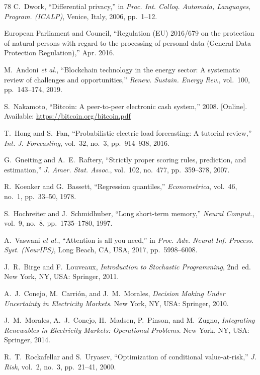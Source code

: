 \documentclass[journal]{IEEEtran}
\begin{document}
\begin{thebibliography}{78}
 C.~Dwork, ``Differential privacy,'' in \textit{Proc. Int. Colloq. Automata, Languages, Program. (ICALP)}, Venice, Italy, 2006, pp.~1--12.

 European Parliament and Council, ``Regulation (EU) 2016/679 on the protection of natural persons with regard to the processing of personal data (General Data Protection Regulation),'' Apr. 2016.

 M.~Andoni \textit{et al.}, ``Blockchain technology in the energy sector: A systematic review of challenges and opportunities,'' \textit{Renew. Sustain. Energy Rev.}, vol.~100, pp.~143--174, 2019.

 S.~Nakamoto, ``Bitcoin: A peer-to-peer electronic cash system,'' 2008. [Online]. Available: \url{https://bitcoin.org/bitcoin.pdf}

 T.~Hong and S.~Fan, ``Probabilistic electric load forecasting: A tutorial review,'' \textit{Int. J. Forecasting}, vol.~32, no.~3, pp.~914--938, 2016.

 G.~Gneiting and A.~E.~Raftery, ``Strictly proper scoring rules, prediction, and estimation,'' \textit{J. Amer. Stat. Assoc.}, vol.~102, no.~477, pp.~359--378, 2007.

 R.~Koenker and G.~Bassett, ``Regression quantiles,'' \textit{Econometrica}, vol.~46, no.~1, pp.~33--50, 1978.

 S.~Hochreiter and J.~Schmidhuber, ``Long short-term memory,'' \textit{Neural Comput.}, vol.~9, no.~8, pp.~1735--1780, 1997.

 A.~Vaswani \textit{et al.}, ``Attention is all you need,'' in \textit{Proc. Adv. Neural Inf. Process. Syst. (NeurIPS)}, Long Beach, CA, USA, 2017, pp.~5998--6008.

 J.~R.~Birge and F.~Louveaux, \textit{Introduction to Stochastic Programming}, 2nd~ed. New York, NY, USA: Springer, 2011.

 A.~J.~Conejo, M.~Carri\'{o}n, and J.~M.~Morales, \textit{Decision Making Under Uncertainty in Electricity Markets}. New York, NY, USA: Springer, 2010.

 J.~M.~Morales, A.~J.~Conejo, H.~Madsen, P.~Pinson, and M.~Zugno, \textit{Integrating Renewables in Electricity Markets: Operational Problems}. New York, NY, USA: Springer, 2014.

 R.~T.~Rockafellar and S.~Uryasev, ``Optimization of conditional value-at-risk,'' \textit{J. Risk}, vol.~2, no.~3, pp.~21--41, 2000.


\end{thebibliography}
\end{document}
